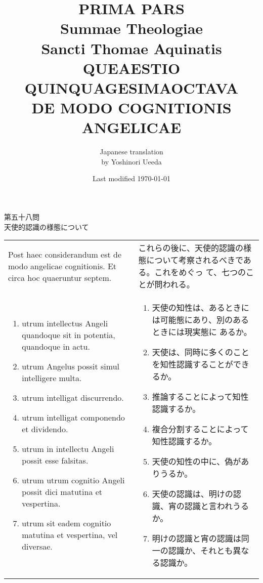 \documentclass[10pt]{jsarticle} %
\title{{\bf PRIMA PARS}\\{\HUGE Summae Theologiae}\\Sancti Thomae
Aquinatis\\{\sffamily QUEAESTIO QUINQUAGESIMAOCTAVA}\\DE MODO
COGNITIONIS ANGELICAE}
\author{Japanese translation\\by Yoshinori {\sc Ueeda}}
\date{Last modified \today}
\begin{document}
\maketitle
\pagestyle{fancy}

\begin{center}
{\Large 第五十八問\\天使的認識の様態について}
\end{center}

\begin{longtable}{p{21em}p{21em}}
Post haec considerandum est de modo angelicae cognitionis. Et circa
hoc quaeruntur septem.

&

これらの後に、天使的認識の様態について考察されるべきである。これをめぐっ
て、七つのことが問われる。


\\


\begin{enumerate}
 \item utrum intellectus Angeli quandoque sit in potentia, quandoque in actu.
 \item utrum Angelus possit simul intelligere multa.
 \item utrum intelligat discurrendo.
 \item utrum intelligat componendo et dividendo.
 \item utrum in intellectu Angeli possit esse falsitas.
 \item utrum utrum cognitio Angeli possit dici matutina et vespertina.
 \item utrum sit eadem cognitio matutina et vespertina, vel diversae.
\end{enumerate}


 &

 \begin{enumerate}
  \item 天使の知性は、あるときには可能態にあり、別のあるときには現実態に
	あるか。
  \item 天使は、同時に多くのことを知性認識することができるか。
  \item 推論することによって知性認識するか。
  \item 複合分割することによって知性認識するか。
  \item 天使の知性の中に、偽がありうるか。
  \item 天使の認識は、明けの認識、宵の認識と言われうるか。
  \item 明けの認識と宵の認識は同一の認識か、それとも異なる認識か。
 \end{enumerate}

\end{longtable}
\end{document}
